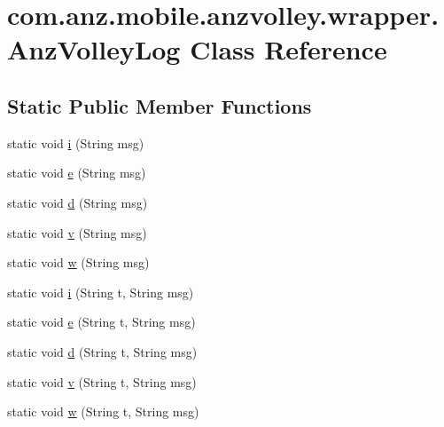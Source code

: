 \hypertarget{classcom_1_1anz_1_1mobile_1_1anzvolley_1_1wrapper_1_1_anz_volley_log}{\section{com.\+anz.\+mobile.\+anzvolley.\+wrapper.\+Anz\+Volley\+Log Class Reference}
\label{classcom_1_1anz_1_1mobile_1_1anzvolley_1_1wrapper_1_1_anz_volley_log}
}
\subsection*{Static Public Member Functions}
\begin{DoxyCompactItemize}
\item 
static void \hyperlink{classcom_1_1anz_1_1mobile_1_1anzvolley_1_1wrapper_1_1_anz_volley_log_acbe21056253ae1d48925cb173c90b79e}{i} (String msg)
\item 
static void \hyperlink{classcom_1_1anz_1_1mobile_1_1anzvolley_1_1wrapper_1_1_anz_volley_log_a91c0ba8d5f7ef9efef8b7829318ed41e}{e} (String msg)
\item 
static void \hyperlink{classcom_1_1anz_1_1mobile_1_1anzvolley_1_1wrapper_1_1_anz_volley_log_af82fbafc09ef7bfa782d3ea338b0dbc0}{d} (String msg)
\item 
static void \hyperlink{classcom_1_1anz_1_1mobile_1_1anzvolley_1_1wrapper_1_1_anz_volley_log_aab4cf1add8f494f62e2103425150f2f3}{v} (String msg)
\item 
static void \hyperlink{classcom_1_1anz_1_1mobile_1_1anzvolley_1_1wrapper_1_1_anz_volley_log_a840687c621f5fd5fb90cef5ffc5cf7f4}{w} (String msg)
\item 
static void \hyperlink{classcom_1_1anz_1_1mobile_1_1anzvolley_1_1wrapper_1_1_anz_volley_log_a651ac231841655ebbfd0d145f0a95e26}{i} (String t, String msg)
\item 
static void \hyperlink{classcom_1_1anz_1_1mobile_1_1anzvolley_1_1wrapper_1_1_anz_volley_log_ad658fa94d309de9b9819cae349ad8430}{e} (String t, String msg)
\item 
static void \hyperlink{classcom_1_1anz_1_1mobile_1_1anzvolley_1_1wrapper_1_1_anz_volley_log_ac034bb30f8a958c4b698784dd4160776}{d} (String t, String msg)
\item 
static void \hyperlink{classcom_1_1anz_1_1mobile_1_1anzvolley_1_1wrapper_1_1_anz_volley_log_a6e192a63edcec827bb0554068b809d1a}{v} (String t, String msg)
\item 
static void \hyperlink{classcom_1_1anz_1_1mobile_1_1anzvolley_1_1wrapper_1_1_anz_volley_log_a19ffe3df143698276b3fc2252742ce15}{w} (String t, String msg)
\end{DoxyCompactItemize}
